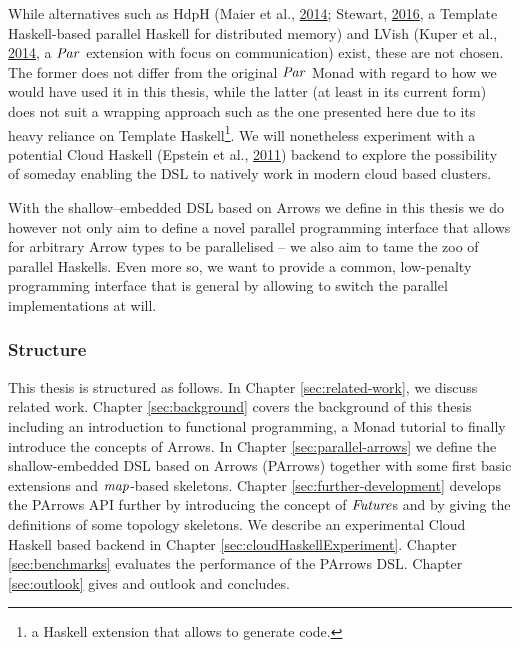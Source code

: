 \documentclass[paper=A4,twoside=true,openright,parskip=full,chapterprefix=true,headings=normal,bibliography=totoc,listof=totoc,titlepage=on,captions=tableabove,draft=false,british]{scrreprt}%
\begin{document}
While alternatives such as HdpH (Maier et al.,
\protect\hyperlink{ref-Maier:2014:HDS:2775050.2633363}{2014}; Stewart,
\protect\hyperlink{ref-stewart_maier_trinder_2016}{2016}, a Template
Haskell-based parallel Haskell for distributed memory) and LVish (Kuper
et al., \protect\hyperlink{ref-Kuper:2014:TPE:2666356.2594312}{2014}, a
\ensuremath{\Conid{Par}} extension with focus on communication) exist, these are not
chosen. The former does not differ from the original \ensuremath{\Conid{Par}} Monad with
regard to how we would have used it in this thesis, while the latter (at
least in its current form) does not suit a wrapping approach such as the
one presented here due to its heavy reliance on Template
Haskell\footnote{a Haskell extension that allows to generate code.}. We
will nonetheless experiment with a potential Cloud Haskell (Epstein et
al., \protect\hyperlink{ref-Epstein:2011:THC:2096148.2034690}{2011})
backend to explore the possibility of someday enabling the DSL to
natively work in modern cloud based clusters.

With the shallow--embedded DSL based on Arrows we define in this thesis
we do however not only aim to define a novel parallel programming
interface that allows for arbitrary Arrow types to be parallelised -- we
also aim to tame the zoo of parallel Haskells. Even more so, we want to
provide a common, low-penalty programming interface that is general by
allowing to switch the parallel implementations at will.

\hypertarget{structure}{%
\subsubsection{Structure}\label{structure}}

This thesis is structured as follows. In Chapter \ref{sec:related-work},
we discuss related work. Chapter \ref{sec:background} covers the
background of this thesis including an introduction to functional
programming, a Monad tutorial to finally introduce the concepts of
Arrows. In Chapter \ref{sec:parallel-arrows} we define the
shallow-embedded DSL based on Arrows (PArrows) together with some first
basic extensions and \ensuremath{\Varid{map}}-based skeletons. Chapter
\ref{sec:further-development} develops the PArrows API further by
introducing the concept of \ensuremath{\Conid{Future}}s and by giving the definitions of
some topology skeletons. We describe an experimental Cloud Haskell based
backend in Chapter \ref{sec:cloudHaskellExperiment}. Chapter
\ref{sec:benchmarks} evaluates the performance of the PArrows DSL.
Chapter \ref{sec:outlook} gives and outlook and concludes.
\end{document}
